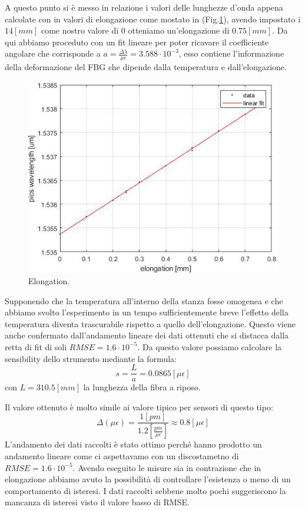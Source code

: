 A questo punto si è messo in relazione i valori delle lunghezze d'onda appena calcolate con in valori di elongazione come mostato in (Fig.\ref{fig:spins}), avendo impostato i $14[mm]$ come nostro valore di 0 otteniamo un'elongazione di $0.75[mm]$. Da qui abbiamo proceduto con un fit lineare per poter ricavare il coefficiente angolare che corrisponde a $a = \frac{\Delta \lambda}{\mu \epsilon} = 3.588 \cdot 10^{-3}$, esso contiene l'informazione della deformazione del FBG che dipende dalla temperatura e dall'elongazione.
\begin{figure}[h]
    \centering
    \includegraphics[scale=0.7]{img/spins.jpg}
    \caption{Elongation.}
    \label{fig:spins}
\end{figure}
 Supponendo che la temperatura all'interno della stanza fosse omogenea e che abbiamo svolto l'esperimento in un tempo sufficientemente breve l'effetto della temperatura diventa trascurabile rispetto a quello dell'elongazione. Questo viene anche confermato dall'andamento lineare dei dati ottenuti che si distacca dalla retta di fit di soli $RMSE = 1.6 \cdot 10^{-5}$. Da questo valore possiamo calcolare la sensibility dello strumento mediante la formula:
$$s = \frac{L}{a} = 0.0865[\mu \epsilon]$$
con $L=310.5[mm]$ la lunghezza della fibra a riposo.


\newpage
{}
Il valore ottenuto è molto simile ai valore tipico per sensori di questo tipo:
$$\Delta(\mu\epsilon) = \frac{1 [pm]}{ 1.2 [\frac{pm}{\mu\epsilon}]} \approx 0.8 [\mu \epsilon]$$
L'andamento dei dati raccolti è stato ottimo perché hanno prodotto un andamento lineare come ci aspettavamo con un discostametno di $RMSE = 1.6 \cdot 10^{-5}$. Avendo eseguito le misure sia in contrazione che in elongazione abbiamo avuto la possibilità di controllare l'esistenza o meno di un comportamento di isteresi. I dati raccolti sebbene molto pochi suggeriscono la mancanza di isteresi visto il valore basso di RMSE.

